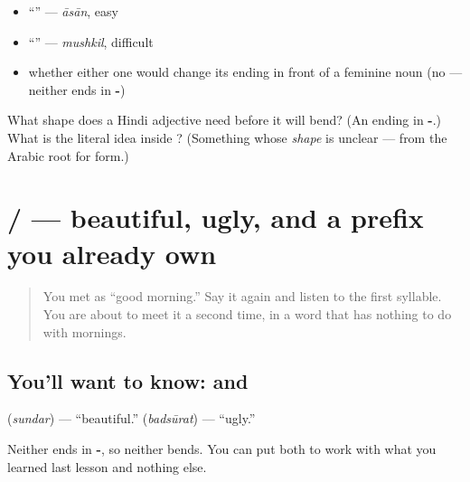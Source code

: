 \begin{itemize}
\raggedright
  \item \textquotedblleft{}\textquotedblright{} — \emph{āsān}, easy
  \item \textquotedblleft{}\textquotedblright{} — \emph{mushkil}, difficult
  \item whether either one would change its ending in front of a feminine noun (no — neither ends in \textbf{-})
\end{itemize}

\begin{tcolorbox}[breakable,colback=teal!4,colframe=teal!35!black,title={Before you move on}]
What shape does a Hindi adjective need before it will bend? (An ending in \textbf{-}.) What is the literal idea inside \textbf{}? (Something whose \emph{shape} is unclear — from the Arabic root for form.)
\end{tcolorbox}
\section[\texorpdfstring{\hi{सुंदर} / \hi{बदसूरत} (sundar / badsūrat)}{सुंदर / बदसूरत (sundar / badsūrat)}]{ /  — beautiful, ugly, and a prefix you already own}

\label{lesson:HI-C80-sundar-badsurat}



\begin{quote}
You met \textbf{} as \textquotedblleft{}good morning.\textquotedblright{} Say it again and listen to the first syllable. You are about to meet it a second time, in a word that has nothing to do with mornings.
\end{quote}

\subsection*{You'll want to know:  and }
\textbf{} (\emph{sundar}) — \textquotedblleft{}beautiful.\textquotedblright{} \textbf{} (\emph{badsūrat}) — \textquotedblleft{}ugly.\textquotedblright{}

Neither ends in \textbf{-}, so neither bends. You can put both to work with what you learned last lesson and nothing else.

